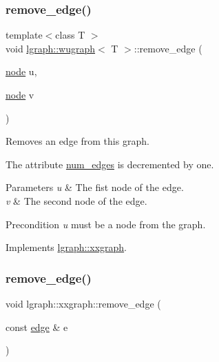 \subsubsection{\texorpdfstring{remove\+\_\+edge()}{remove\_edge()}\hspace{0.1cm}{\footnotesize\ttfamily [1/2]}}
{\footnotesize\ttfamily template$<$class T $>$ \\
void \hyperlink{classlgraph_1_1wugraph}{lgraph\+::wugraph}$<$ T $>$\+::remove\+\_\+edge (\begin{DoxyParamCaption}\item[{\hyperlink{namespacelgraph_a397169dd66adf725210a30fb7251773e}{node}}]{u,  }\item[{\hyperlink{namespacelgraph_a397169dd66adf725210a30fb7251773e}{node}}]{v }\end{DoxyParamCaption})\hspace{0.3cm}{\ttfamily [virtual]}}



Removes an edge from this graph. 

The attribute \hyperlink{classlgraph_1_1xxgraph_a6765a9a3be42f6e0f824635c593b35d7}{num\+\_\+edges} is decremented by one. 
\begin{DoxyParams}{Parameters}
{\em u} & The fist node of the edge. \\
\hline
{\em v} & The second node of the edge. \\
\hline
\end{DoxyParams}
\begin{DoxyPrecond}{Precondition}
{\itshape u} must be a node from the graph. 
\end{DoxyPrecond}


Implements \hyperlink{classlgraph_1_1xxgraph_a7fd3a1309cde4f408c8d9d4cb3b898a8}{lgraph\+::xxgraph}.

\mbox{\label{classlgraph_1_1xxgraph_a46a75fa2a10a8674ab930e9dc766e2f9}} 
\subsubsection{\texorpdfstring{remove\+\_\+edge()}{remove\_edge()}\hspace{0.1cm}{\footnotesize\ttfamily [2/2]}}
{\footnotesize\ttfamily void lgraph\+::xxgraph\+::remove\+\_\+edge (\begin{DoxyParamCaption}\item[{const \hyperlink{namespacelgraph_a76bd7d50719f03de7a85db259d80d572}{edge} \&}]{e }\end{DoxyParamCaption})\hspace{0.3cm}{\ttfamily [inherited]}}



